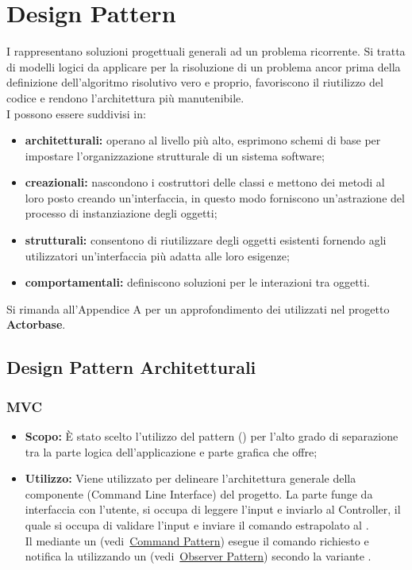 \documentclass{scalatekids-article}
\begin{document}
\section{Design Pattern}

I  rappresentano soluzioni progettuali generali ad un
problema ricorrente. Si tratta di  modelli logici da applicare per la
risoluzione di un problema ancor prima della definizione dell'algoritmo
risolutivo vero e proprio, favoriscono il riutilizzo del codice e rendono
l'architettura più manutenibile.\\
I  possono essere suddivisi in:

\begin{itemize}
\item \textbf{architetturali:} operano al livello più alto,
  esprimono schemi di base per impostare l'organizzazione strutturale di un
  sistema software;
\item \textbf{creazionali:} nascondono i costruttori delle classi e mettono dei
  metodi al loro posto creando un'interfaccia, in questo modo forniscono
  un'astrazione del processo di instanziazione degli oggetti;
\item \textbf{strutturali:} consentono di riutilizzare degli oggetti esistenti
  fornendo agli utilizzatori un'interfaccia più adatta alle loro esigenze;
\item \textbf{comportamentali:} definiscono soluzioni per le interazioni tra
  oggetti.
\end{itemize}

Si rimanda all'Appendice A per un approfondimento dei 
utilizzati nel progetto \textbf{Actorbase}.

\subsection{Design Pattern Architetturali}

\subsubsection{MVC}

\begin{itemize}
\item \textbf{Scopo:} È stato scelto l'utilizzo del pattern 
    () per l'alto grado di separazione
  tra la parte logica dell'applicazione e parte grafica che offre;
\item \textbf{Utilizzo:} Viene utilizzato per delineare l'architettura generale
  della componente  (Command Line Interface) del progetto. La parte
   funge da interfaccia con l'utente, si occupa di leggere l'input e
  inviarlo al Controller, il quale si occupa di validare l'input
  e inviare il comando estrapolato al .\\
  Il  mediante un  (vedi~\hyperref[sec:CommandPattern]{Command Pattern})
  esegue il comando richiesto e notifica la  utilizzando un 
  (vedi~\hyperref[sec:ObserverPattern]{Observer Pattern}) secondo la variante .
\end{itemize}
\end{document}
